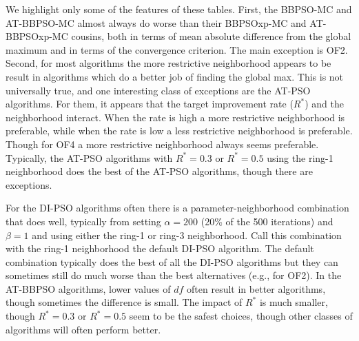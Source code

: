 \documentclass[12pt]{article}
\begin{document}
\begin{appendix}
We highlight only some of the features of these tables. First, the BBPSO-MC and AT-BBPSO-MC almost always do worse than their BBPSOxp-MC and AT-BBPSOxp-MC cousins, both in terms of mean absolute difference from the global maximum and in terms of the convergence criterion. The main exception is OF2. Second, for most algorithms the more restrictive neighborhood appears to be result in algorithms which do a better job of finding the global max. This is not universally true, and one interesting class of exceptions are the AT-PSO algorithms. For them, it appears that the target improvement rate ($R^*$) and the neighborhood interact. When the rate is high a more restrictive neighborhood is preferable, while when the rate is low a less restrictive neighborhood is preferable. Though for OF4 a more restrictive neighborhood always seems preferable. Typically, the AT-PSO algorithms with $R^*=0.3$ or $R^*=0.5$ using the ring-1 neighborhood does the best of the AT-PSO algorithms, though there are exceptions.

For the DI-PSO algorithms often there is a parameter-neighborhood combination that does well, typically from setting $\alpha=200$ (20\% of the 500 iterations) and $\beta=1$ and using either the ring-1 or ring-3 neighborhood. Call this combination with the ring-1 neighborhood the default DI-PSO algorithm. The default combination typically does the best of all the DI-PSO algorithms but they can sometimes still do much worse than the best alternatives (e.g., for OF2). In the AT-BBPSO algorithms, lower values of $df$ often result in better algorithms, though sometimes the difference is small. The impact of $R^*$ is much smaller, though $R^*=0.3$ or $R^*=0.5$ seem to be the safest choices, though other classes of algorithms will often perform better. 


\end{appendix}
\end{document}

